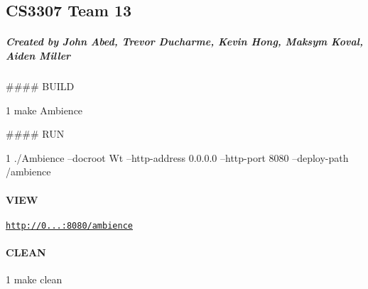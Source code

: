\subsection*{C\+S3307 Team 13}

\subparagraph*{Created by John Abed, Trevor Ducharme, Kevin Hong, Maksym Koval, Aiden Miller}

\#\#\#\# B\+U\+I\+LD 
\begin{DoxyCode}
1 make Ambience
\end{DoxyCode}


\#\#\#\# R\+UN 
\begin{DoxyCode}
1 ./Ambience --docroot Wt --http-address 0.0.0.0 --http-port 8080 --deploy-path /ambience
\end{DoxyCode}


\paragraph*{V\+I\+EW}

\href{http://0.0.0.0:8080/ambience}{\tt http\+://0...\+:8080/ambience}

\paragraph*{C\+L\+E\+AN}


\begin{DoxyCode}
1 make clean
\end{DoxyCode}
 